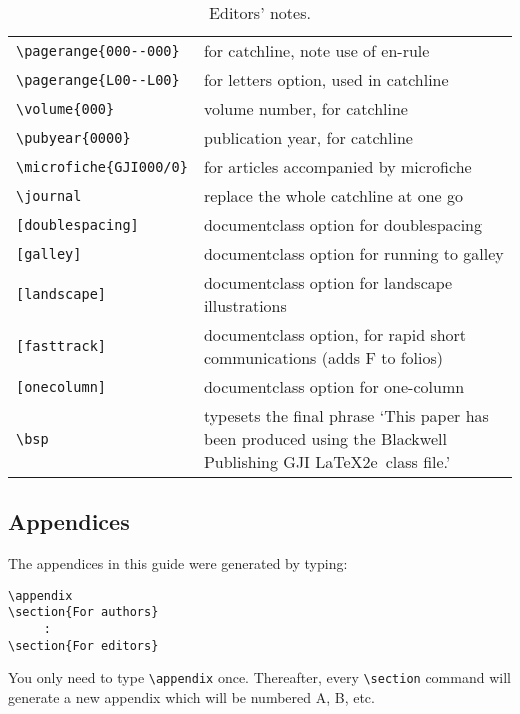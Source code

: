 \documentclass{gji}
\begin{document}
\begin{table*}
\begin{minipage}{130mm}
\caption{Editors' notes.}
\label{editors}
\begin{tabular}{@{}lp{270pt}}
\verb"\pagerange{000--000}"& for catchline, note use of en-rule\\
\verb"\pagerange{L00--L00}"& for letters option, used in catchline\\
\verb"\volume{000}" & volume number, for catchline\\
\verb"\pubyear{0000}" & publication year, for catchline\\
\verb"\microfiche{GJI000/0}" & for articles accompanied by microfiche\\
\verb"\journal" & replace the whole catchline at one go\\
\verb"[doublespacing]" & documentclass option for doublespacing\\
\verb"[galley]" & documentclass option for running to galley\\
\verb"[landscape]" & documentclass option for landscape illustrations\\
\verb"[fasttrack]" & documentclass option, for rapid short communications
                   (adds F to folios)\\
\verb"[onecolumn]" & documentclass option for one-column \\
\verb"\bsp"& typesets the final phrase `This paper has been produced
 using the Blackwell Publishing GJI \LaTeX2e\ class file.'\\
\end{tabular}
\end{minipage}
\end{table*}

\subsection{Appendices}

The appendices in this guide were generated by typing:
\begin{verbatim}
\appendix
\section{For authors}
     :
\section{For editors}
\end{verbatim}
You only need to type \verb"\appendix" once. Thereafter, every
\verb"\section" command will generate a new appendix which will be
numbered A, B, etc.
\end{document}
